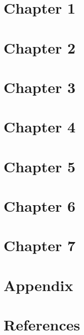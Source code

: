 \documentclass[12pt,oneside]{book}
\begin{document}
\fancyhead[RO]{\leftmark}
\fancyhead[LE]{\textsc{\chaptername~\thechapter}}


\part*{Chapter 1}


\part*{Chapter 2}


\part*{Chapter 3}


\part*{Chapter 4}



\part*{Chapter 5}


\part*{Chapter 6}


\part*{Chapter 7}



\part*{Appendix}
\appendix
\renewcommand\chaptername{Appendix}




\part*{References}
\renewcommand{\bibname}{References}

\end{document}
